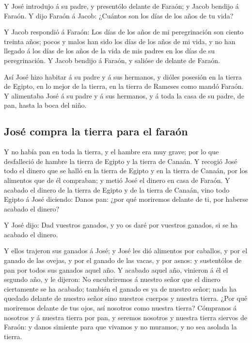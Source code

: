  Y José introdujo á su padre, y presentólo delante de
Faraón; y Jacob bendijo á Faraón.  Y dijo Faraón á Jacob:
¿Cuántos son los días de los años de tu vida?

 Y Jacob respondió á Faraón: Los días de los años de mi
peregrinación son ciento treinta años; pocos y malos han sido los días
de los años de mi vida, y no han llegado á los días de los años de la
vida de mis padres en los días de su peregrinación.  Y
Jacob bendijo á Faraón, y salióse de delante de Faraón.

 Así José hizo habitar á su padre y á sus hermanos, y
dióles posesión en la tierra de Egipto, en lo mejor de la tierra, en la
tierra de Rameses como mandó Faraón.  Y alimentaba José á
su padre y á sus hermanos, y á toda la casa de su padre, de pan, hasta
la boca del niño.

\hypertarget{josuxe9-compra-la-tierra-para-el-farauxf3n}{%
\subsection{José compra la tierra para el
faraón}\label{josuxe9-compra-la-tierra-para-el-farauxf3n}}

 Y no había pan en toda la tierra, y el hambre era muy
grave; por lo que desfalleció de hambre la tierra de Egipto y la tierra
de Canaán.  Y recogió José todo el dinero que se halló en
la tierra de Egipto y en la tierra de Canaán, por los alimentos que de
él compraban; y metió José el dinero en casa de Faraón.  Y
acabado el dinero de la tierra de Egipto y de la tierra de Canaán, vino
todo Egipto á José diciendo: Danos pan: ¿por qué moriremos delante de
ti, por haberse acabado el dinero?

 Y José dijo: Dad vuestros ganados, y yo os daré por
vuestros ganados, si se ha acabado el dinero.

 Y ellos trajeron sus ganados á José; y José les dió
alimentos por caballos, y por el ganado de las ovejas, y por el ganado
de las vacas, y por asnos: y sustentólos de pan por todos sus ganados
aquel año.  Y acabado aquel año, vinieron á él el segundo
año, y le dijeron: No encubriremos á nuestro señor que el dinero
ciertamente se ha acabado; también el ganado es ya de nuestro señor;
nada ha quedado delante de nuestro señor sino nuestros cuerpos y nuestra
tierra.  ¿Por qué moriremos delante de tus ojos, así
nosotros como nuestra tierra? Cómpranos á nosotros y á nuestra tierra
por pan, y seremos nosotros y nuestra tierra siervos de Faraón: y danos
simiente para que vivamos y no muramos, y no sea asolada la tierra.

